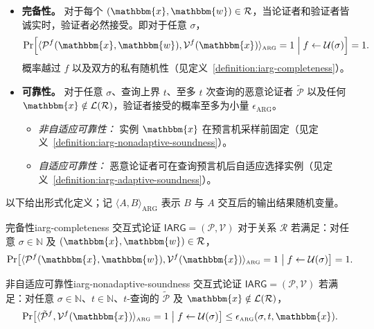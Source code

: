 \documentclass[american,singlepageview]{snargs-book-zh}
\newcommand{\Malicious}[1]{\tilde{#1}}
\newcommand{\Interact}[2]{\langle #1, #2 \rangle}
\newcommand{\Naturals}{\mathbb{N}}
\newcommand{\Relation}{\mathcal{R}}
\newcommand{\Language}{\mathcal{L}}
\newcommand{\GetLanguage}[1]{\Language(#1)}
\newcommand{\Instance}{\mathbbm{x}}
\newcommand{\Witness}{\mathbbm{w}}
\newcommand{\ProtoProver}{P}
\newcommand{\ProtoVerifier}{V}
\newcommand{\ProtoSoundnessError}{\epsilon}
\newcommand{\ARGSubscript}{\scriptscriptstyle\mathrm{ARG}}
\newcommand{\ARGFormat}[1]{\mathcal{#1}}
\newcommand{\ARGProver}{\ARGFormat{\ProtoProver}}
\newcommand{\ARGVerifier}{\ARGFormat{\ProtoVerifier}}
\newcommand{\ARGSystem}{(\ARGProver,\ARGVerifier)}
\newcommand{\ARGNASoundnessError}{\ProtoSoundnessError_{\ARGSubscript}}
\newcommand{\ARGSoundnessError}{\ProtoSoundnessError_{\ARGSubscript}}
\newcommand{\ARGInteract}[2]{\Interact{#1}{#2}_{\scriptscriptstyle\mathrm{ARG}}}
\newcommand{\IARGSymbol}{\mathsf{IARG}}
\newcommand{\ROFunction}{f}
\newcommand{\ROQueryBound}{t}
\newcommand{\RODistribution}[1]{\mathcal{U}(#1)}
\newcommand{\ROOutputSize}{\sigma}
\begin{document}
\begin{itemize}[noitemsep]
  \item \textbf{完备性。} 对于每个 $(\Instance,\Witness)\in\Relation$，当论证者和验证者皆诚实时，验证者必然接受。即对于任意 $\ROOutputSize$，
  \[
  \Pr\Bigl[
    \ARGInteract{\ARGProver^{\ROFunction}(\Instance,\Witness)}{\ARGVerifier^{\ROFunction}(\Instance)}=1
    \;\Big|\;\ROFunction\gets\RODistribution{\ROOutputSize}
  \Bigr]
  =1.
  \]
  概率越过 $\ROFunction$ 以及双方的私有随机性（见定义~\ref{definition:iarg-completeness}）。

  \item \textbf{可靠性。} 对于任意 $\ROOutputSize$、查询上界 $\ROQueryBound$、至多 $\ROQueryBound$ 次查询的恶意论证者 $\Malicious{\ARGProver}$ 以及任何 $\Instance\notin\GetLanguage\Relation$，验证者接受的概率至多为小量 $\ARGSoundnessError$。    
  
  \begin{itemize}[noitemsep]
    \item \emph{非自适应可靠性：} 实例 $\Instance$ 在预言机采样前固定（见定义~\ref{definition:iarg-nonadaptive-soundness}）。
    \item \emph{自适应可靠性：} 恶意论证者可在查询预言机后自适应选择实例（见定义~\ref{definition:iarg-adaptive-soundness}）。
  \end{itemize}
\end{itemize}

以下给出形式化定义；记 $\ARGInteract{A}{B}$ 表示 $B$ 与 $A$ 交互后的输出结果随机变量。

\begin{ImportantDefinition}{完备性}{iarg-completeness}
交互式论证 $\IARGSymbol=\ARGSystem$ 对于关系 $\Relation$ 若满足：对任意 $\ROOutputSize\in\Naturals$ 及 $(\Instance,\Witness)\in\Relation$，
\[
\Pr\bigl[
  \ARGInteract{\ARGProver^{\ROFunction}(\Instance,\Witness)}{\ARGVerifier^{\ROFunction}(\Instance)}=1
  \;\big|\;
  \ROFunction\gets\RODistribution{\ROOutputSize}
\bigr]
=1.
\]
\end{ImportantDefinition}

\begin{ImportantDefinition}{非自适应可靠性}{iarg-nonadaptive-soundness}
交互式论证 $\IARGSymbol=\ARGSystem$ 若满足：对任意 $\ROOutputSize\in\Naturals$、$\ROQueryBound\in\Naturals$、$\ROQueryBound$-查询的 $\Malicious{\ARGProver}$ 及 $\Instance\notin\GetLanguage\Relation$，
\[
\Pr\bigl[
  \ARGInteract{\Malicious{\ARGProver}^{\ROFunction}}{\ARGVerifier^{\ROFunction}(\Instance)}=1
  \;\big|\;\ROFunction\gets\RODistribution{\ROOutputSize}
\bigr]
\le
\ARGNASoundnessError(\ROOutputSize,\ROQueryBound,\Instance).
\]
\end{ImportantDefinition}
\end{document}

